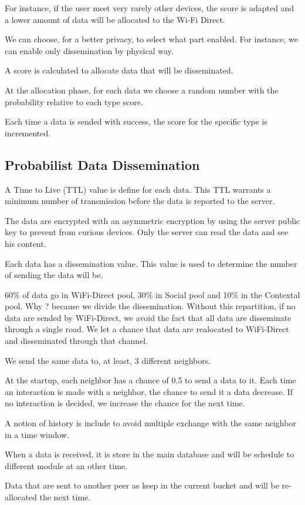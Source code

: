 For instance, if the user meet very rarely other devices, the score is adapted and a lower amount of data will be allocated to the Wi-Fi Direct.

We can choose, for a better privacy, to select what part enabled. For instance, we can enable only dissemination by physical way.

A score is calculated to allocate data that will be disseminated.

At the allocation phase, for each data we choose a random number with the probability relative to each type score. 

Each time a data is sended with success, the score for the specific type is incremented.

\subsection{Probabilist Data Dissemination}



A Time to Live (TTL) value is define for each data.
This TTL warrants a minimum number of transmission before the data is reported to the server.

The data are encrypted with an asymmetric encryption by using the server public key to prevent from curious devices. Only the server can read the data and see his content.

Each data has a dissemination value.
This value is used to determine the number of sending the data will be.

60\% of data go in WiFi-Direct pool, 30\% in Social pool and 10\% in the Contextal pool.
Why ? because we divide the dissemination. Without this repartition, if no data are sended by WiFi-Direct, we avoid the fact that all data are disseminate through a single road.
We let a chance that data are realocated to WiFi-Direct and disseminated through that channel.

We send the same data to, at least, 3 different neighbors.

At the startup, each neighbor has a chance of 0.5 to send a data to it. Each time an interaction is made with a neighbor, the chance to send it a data decrease. If no interaction is decided, we increase the chance for the next time.

A notion of history is include to avoid multiple exchange with the same neighbor in a time window.

When a data is received, it is store in the main database and will be schedule to different module at an other time.

Data that are sent to another peer as keep in the current bucket and will be re-allocated the next time.